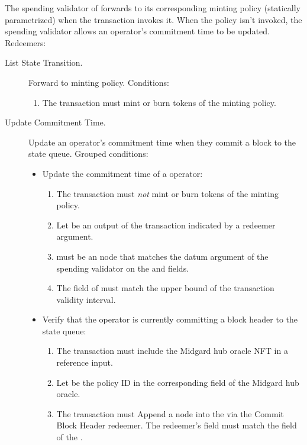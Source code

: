 \documentclass[../midgard.tex]{subfiles}
\begin{document}
The spending validator of  forwards to its corresponding minting policy (statically parametrized) when the transaction invokes it. When the policy isn't invoked, the spending validator allows an operator's commitment time to be updated. Redeemers:
\begin{description}
    \item[List State Transition.] Forward to minting policy. Conditions:
        \begin{enumerate}
            \item The transaction must mint or burn tokens of the  minting policy.
        \end{enumerate}
    \item[Update Commitment Time.] Update an operator's commitment time when they commit a block to the state queue. Grouped conditions:
        \begin{itemize}
            \item Update the commitment time of a operator:
            \begin{enumerate} 
                \item The transaction must \emph{not} mint or burn tokens of the  minting policy.
                \item Let  be an output of the transaction indicated by a redeemer argument.
                \item {} must be an  node that matches the datum argument of the spending validator on the  and  fields.
                \item The  field of  must match the upper bound of the transaction validity interval.
            \end{enumerate}
            \item Verify that the operator is currently committing a block header to the state queue:
            \begin{enumerate}[resume]
                \item The transaction must include the Midgard hub oracle NFT in a reference input. 
                \item Let  be the policy ID in the corresponding field of the Midgard hub oracle.
                \item The transaction must Append a node into the  via the Commit Block Header redeemer. The redeemer's  field must match the  field of the .
            \end{enumerate}
        \end{itemize}
\end{description}
\end{document}
